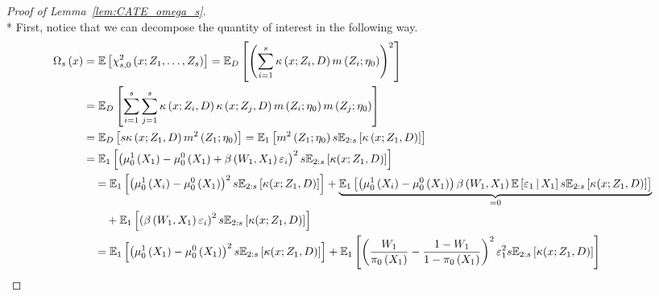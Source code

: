 \begin{proof}[Proof of Lemma~\ref{lem:CATE_omega_s}]\mbox{}\\*
    First, notice that we can decompose the quantity of interest in the following way.
	\begin{equation}
		\begin{aligned}
			\Omega_{s}\left(x\right)
			 & = \E\left[\chi_{s,0}^{2}\left(x; Z_1, \ldots,  Z_{s}\right)\right]
             = \E_{D}\left[\left(\sum_{i = 1}^{s} \kappa\left(x; Z_{i}, D\right) m\left(Z_{i}; \eta_{0}\right)\right)^2\right]\\
             & = \E_{D}\left[\sum_{i = 1}^{s}\sum_{j = 1}^{s}\kappa\left(x; Z_{i}, D\right)\kappa\left(x; Z_{j}, D\right)
             m\left(Z_{i}; \eta_{0}\right)m\left(Z_{j}; \eta_{0}\right)\right] \\
             & = \E_{D}\left[s \kappa\left(x; Z_1, D\right)  m^2\left(Z_{1}; \eta_{0}\right)\right]
             = \E_{1}\left[ m^2\left(Z_{1}; \eta_{0}\right) s \E_{2:s}\left[\kappa\left(x; Z_1, D\right)\right]\right]\\
             & = \E_{1}\left[\left(\mu_{0}^{1}\left(X_{1}\right) - \mu_{0}^{0}\left(X_{1}\right) + \beta\left(W_{1}, X_{1}\right)\varepsilon_{i}\right)^2 s \E_{2:s}\left[\kappa(x; Z_1, D)\right]\right]                                                                                             \\
			 & \quad = \E_{1}\left[\left(\mu_{0}^{1}\left(X_{i}\right) - \mu_{0}^{0}\left(X_{1}\right)\right)^2 s \E_{2:s}\left[\kappa(x; Z_1, D)\right]\right]
			+ \underbrace{\E_{1}\left[\left(\mu_{0}^{1}\left(X_{i}\right) - \mu_{0}^{0}\left(X_{1}\right)\right)\beta\left(W_{1}, X_{1}\right)\E\left[\varepsilon_{1} \, \middle| \, X_1\right] s \E_{2:s}\left[\kappa(x; Z_1, D)\right]\right]}_{=0}                                              \\
			 & \quad \quad + \E_{1}\left[\left(\beta\left(W_{1}, X_{1}\right)\varepsilon_{i}\right)^2 s \E_{2:s}\left[\kappa(x; Z_1, D)\right]\right]                                                                                                                                  \\
			 & \quad =  \E_{1}\left[\left(\mu_{0}^{1}\left(X_{1}\right) - \mu_{0}^{0}\left(X_{1}\right)\right)^2 s \E_{2:s}\left[\kappa(x; Z_1, D)\right]\right]
			+ \E_{1}\left[\left(\frac{W_{1}}{\pi_{0}\left(X_1\right)} - \frac{1 - W_{1}}{1 - \pi_{0}\left(X_1\right)}\right)^2 \varepsilon_{1}^2 s \E_{2:s}\left[\kappa(x; Z_1, D)\right]\right]                                                                                               \\

\end{aligned}
\end{equation}
\end{proof}
